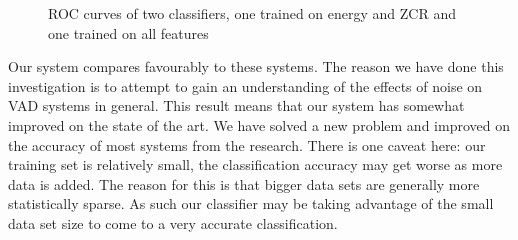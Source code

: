 \documentclass[ %
                    author={Sam Phippen},
                supervisor={Dr. Rafal Bogacz},
                     title={Real time voice activity detectors in noisy personal computing environments},
                  subtitle={},
                    degree={MEng},
                      year={2012} ]{thesis}
\begin{document}
\begin{figure}

    \caption{ROC curves of two classifiers, one trained on energy and ZCR and
    one trained on all features}
    \label{fig:reduced-features}
\end{figure}


Our system compares favourably to these systems. The reason we have done this
investigation is to attempt to gain an understanding of the effects of noise on
VAD systems in general. This result means that our system has somewhat improved
on the state of the art. We have solved a new problem and improved on the
accuracy of most systems from the research. There is one caveat here: our
training set is relatively small, the classification accuracy may get worse as
more data is added. The reason for this is that bigger data sets are generally
more statistically sparse. As such our classifier may be taking advantage of
the small data set size to come to a very accurate classification.

%
%
\end{document}
